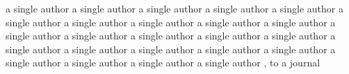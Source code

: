 \documentclass[10pt,a4paper]{article}
\begin{document}
a single author a single author a single author a single author a single author a single author a single author a single author a single author a single author a single author a single author a single author a single author a single author a single author a single author a single author a single author a single author a single author a single author a single author a single author \cite{Root1934}, to a journal


\end{document}
